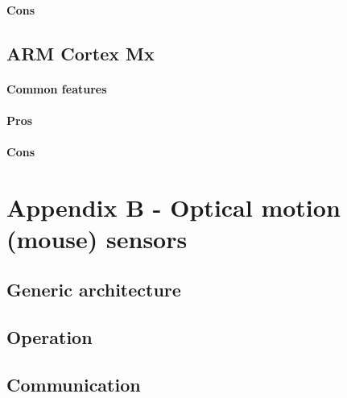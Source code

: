 \documentclass[a4paper,10pt]{article}
\begin{document}
\begin{multicols}{2}
\paragraph{Cons}
\TODO


\subsection{ARM Cortex Mx}

\TODO


\paragraph{Common features}
\TODO


\paragraph{Pros}
\TODO


\paragraph{Cons}
\TODO


\section{Appendix B - Optical motion (mouse) sensors}

\TODO


\subsection{Generic architecture}

\TODO


\subsection{Operation}

\TODO


\subsection{Communication}


\end{multicols}
\end{document}
